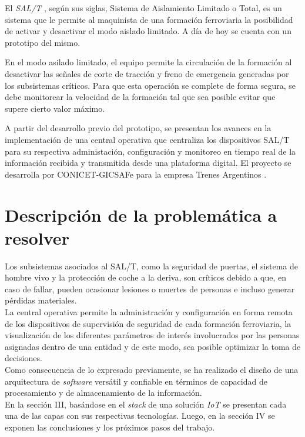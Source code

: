 \documentclass[a4paper]{IEEEtran}
\begin{document}
El \textit{SAL/T} \cite{b1}, según sus siglas, Sistema de Aislamiento Limitado o Total, es un sistema que le permite al maquinista de una formación ferroviaria la posibilidad de activar y desactivar el modo aislado limitado. A día de hoy se cuenta con un prototipo del mismo.

En el modo asilado limitado, el equipo permite la circulación de la formación al desactivar las señales de corte de tracción y freno de emergencia generadas por los subsistemas críticos. Para que esta operación se complete de forma segura, se debe monitorear la velocidad de la formación tal que sea posible evitar que supere cierto valor máximo.

A partir del desarrollo previo del prototipo, se presentan los avances en la implementación de una central operativa que centraliza los dispositivos SAL/T para su respectiva administación, configuración y monitoreo en tiempo real de la información recibida y transmitida desde una plataforma digital. El proyecto se desarrolla por CONICET-GICSAFe \cite{b2} para la empresa Trenes Argentinos \cite{b3}. 

\section{Descripción de la problemática a resolver}

Los subsistemas asociados al SAL/T, como la seguridad de puertas, el sistema de hombre vivo y la protección de coche a la deriva, son críticos debido a que, en caso de fallar, pueden ocasionar lesiones o muertes de personas e incluso generar pérdidas materiales. \\ 

La central operativa permite la administración y configuración en forma remota de los dispositivos de supervisión de seguridad de cada formación ferroviaria, la visualización de los diferentes parámetros de interés involucrados por las personas asignadas dentro de una entidad y de este modo, sea posible optimizar la toma de decisiones. \\

Como consecuencia de lo expresado previamente, se ha realizado el diseño de una arquitectura de \textit{software} versátil y confiable en términos de capacidad de procesamiento y de almacenamiento de la información. \\

En la sección III, basándose en el \textit{stack} de una solución \textit{IoT} \cite{b4} se presentan cada una de las capas con sus respectivas tecnologías. Luego, en la sección IV se exponen las conclusiones y los próximos pasos del trabajo.
\end{document}
